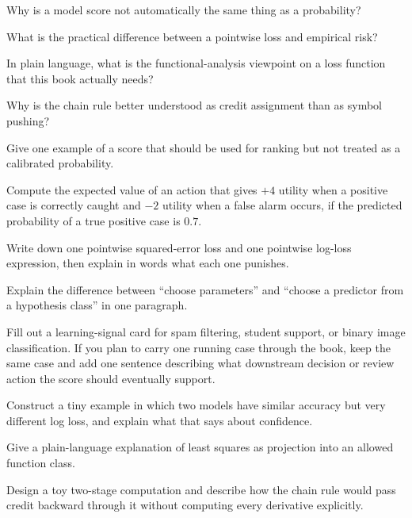 \begin{studyquestions}
\item Why is a model score not automatically the same thing as a probability?
\item What is the practical difference between a pointwise loss and empirical risk?
\item In plain language, what is the functional-analysis viewpoint on a loss function that this book actually needs?
\item Why is the chain rule better understood as credit assignment than as symbol pushing?
\end{studyquestions}

\begin{exercises}
\item Give one example of a score that should be used for ranking but not treated as a calibrated probability.
\item Compute the expected value of an action that gives \(+4\) utility when a positive case is correctly caught and \(-2\) utility when a false alarm occurs, if the predicted probability of a true positive case is \(0.7\).
\item Write down one pointwise squared-error loss and one pointwise log-loss expression, then explain in words what each one punishes.
\item Explain the difference between ``choose parameters'' and ``choose a predictor from a hypothesis class'' in one paragraph.
\item Fill out a learning-signal card for spam filtering, student support, or binary image classification. If you plan to carry one running case through the book, keep the same case and add one sentence describing what downstream decision or review action the score should eventually support.
\end{exercises}

\begin{challengeexercises}
\item Construct a tiny example in which two models have similar accuracy but very different log loss, and explain what that says about confidence.
\item Give a plain-language explanation of least squares as projection into an allowed function class.
\item Design a toy two-stage computation and describe how the chain rule would pass credit backward through it without computing every derivative explicitly.
\end{challengeexercises}
